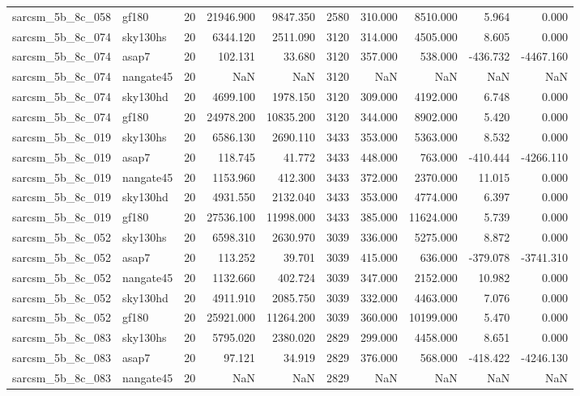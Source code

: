 \begin{longtable}{llrrrrrrrr}
sarcsm\_5b\_8c\_058 & gf180 & 20 & 21946.900 & 9847.350 & 2580 & 310.000 & 8510.000 & 5.964 & 0.000 \\
sarcsm\_5b\_8c\_074 & sky130hs & 20 & 6344.120 & 2511.090 & 3120 & 314.000 & 4505.000 & 8.605 & 0.000 \\
sarcsm\_5b\_8c\_074 & asap7 & 20 & 102.131 & 33.680 & 3120 & 357.000 & 538.000 & -436.732 & -4467.160 \\
sarcsm\_5b\_8c\_074 & nangate45 & 20 & NaN & NaN & 3120 & NaN & NaN & NaN & NaN \\
sarcsm\_5b\_8c\_074 & sky130hd & 20 & 4699.100 & 1978.150 & 3120 & 309.000 & 4192.000 & 6.748 & 0.000 \\
sarcsm\_5b\_8c\_074 & gf180 & 20 & 24978.200 & 10835.200 & 3120 & 344.000 & 8902.000 & 5.420 & 0.000 \\
sarcsm\_5b\_8c\_019 & sky130hs & 20 & 6586.130 & 2690.110 & 3433 & 353.000 & 5363.000 & 8.532 & 0.000 \\
sarcsm\_5b\_8c\_019 & asap7 & 20 & 118.745 & 41.772 & 3433 & 448.000 & 763.000 & -410.444 & -4266.110 \\
sarcsm\_5b\_8c\_019 & nangate45 & 20 & 1153.960 & 412.300 & 3433 & 372.000 & 2370.000 & 11.015 & 0.000 \\
sarcsm\_5b\_8c\_019 & sky130hd & 20 & 4931.550 & 2132.040 & 3433 & 353.000 & 4774.000 & 6.397 & 0.000 \\
sarcsm\_5b\_8c\_019 & gf180 & 20 & 27536.100 & 11998.000 & 3433 & 385.000 & 11624.000 & 5.739 & 0.000 \\
sarcsm\_5b\_8c\_052 & sky130hs & 20 & 6598.310 & 2630.970 & 3039 & 336.000 & 5275.000 & 8.872 & 0.000 \\
sarcsm\_5b\_8c\_052 & asap7 & 20 & 113.252 & 39.701 & 3039 & 415.000 & 636.000 & -379.078 & -3741.310 \\
sarcsm\_5b\_8c\_052 & nangate45 & 20 & 1132.660 & 402.724 & 3039 & 347.000 & 2152.000 & 10.982 & 0.000 \\
sarcsm\_5b\_8c\_052 & sky130hd & 20 & 4911.910 & 2085.750 & 3039 & 332.000 & 4463.000 & 7.076 & 0.000 \\
sarcsm\_5b\_8c\_052 & gf180 & 20 & 25921.000 & 11264.200 & 3039 & 360.000 & 10199.000 & 5.470 & 0.000 \\
sarcsm\_5b\_8c\_083 & sky130hs & 20 & 5795.020 & 2380.020 & 2829 & 299.000 & 4458.000 & 8.651 & 0.000 \\
sarcsm\_5b\_8c\_083 & asap7 & 20 & 97.121 & 34.919 & 2829 & 376.000 & 568.000 & -418.422 & -4246.130 \\
sarcsm\_5b\_8c\_083 & nangate45 & 20 & NaN & NaN & 2829 & NaN & NaN & NaN & NaN \\

\end{longtable}
